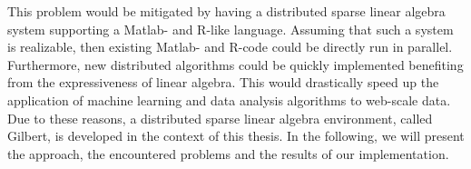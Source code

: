 This problem would be mitigated by having a distributed sparse linear algebra system supporting a Matlab- and R-like language.
Assuming that such a system is realizable, then existing Matlab- and R-code could be directly run in parallel.
Furthermore, new distributed algorithms could be quickly implemented benefiting from the expressiveness of linear algebra.
This would drastically speed up the application of machine learning and data analysis algorithms to web-scale data.
Due to these reasons, a distributed sparse linear algebra environment, called Gilbert, is developed in the context of this thesis.
In the following, we will present the approach, the encountered problems and the results of our implementation.
